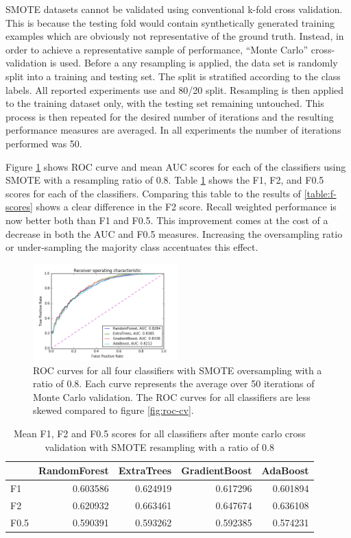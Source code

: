 \documentclass[journal]{IEEEtran}
\begin{document}
SMOTE datasets cannot be validated using conventional k-fold cross validation. This is because the testing fold would contain synthetically generated training examples which are obviously not representative of the ground truth. Instead, in order to achieve a representative sample of performance, ``Monte Carlo'' cross-validation \cite{dubitzky2007fundamentals} is used. Before a any resampling is applied, the data set is randomly split into a training and testing set. The split is stratified according to the class labels. All reported experiments use and 80/20 split. Resampling is then applied to the training dataset only, with the testing set remaining untouched. This process is then repeated for the desired number of iterations and the resulting performance measures are averaged. In all experiments the number of iterations performed was 50.  

Figure \ref{fig:roc-smote} shows ROC curve and mean AUC scores for each of the classifiers using SMOTE with a resampling ratio of 0.8. Table \ref{table:f-score-smote} shows the F1, F2, and F0.5 scores for each of the classifiers. Comparing this table to the results of \ref{table:f-scores} shows a clear difference in the F2 score. Recall weighted performance is now better both than F1 and F0.5. This improvement comes at the cost of a decrease in both the AUC and F0.5 measures. Increasing the oversampling ratio or under-sampling the majority class accentuates this effect.

\begin{figure}[!t]
\centering
\includegraphics[width=0.5\textwidth]{../src/img/roc_smote.png}
\caption{ROC curves for all four classifiers with SMOTE oversampling with a ratio of 0.8. Each curve represents the average over 50 iterations of Monte Carlo validation. The ROC curves for all classifiers are less skewed compared to figure \ref{fig:roc-cv}.}
\label{fig:roc-smote}
\end{figure}

\begin{table}
\caption{Mean F1, F2 and F0.5 scores for all classifiers after monte carlo cross validation with SMOTE resampling with a ratio of 0.8}
\begin{tabular}{lrrrr}
{} &  RandomForest &  ExtraTrees &  GradientBoost &  AdaBoost \\
\hline
F1   &      0.603586 &    0.624919 &       0.617296 &  0.601894 \\
F2   &      0.620932 &    0.663461 &       0.647674 &  0.636108 \\
F0.5 &      0.590391 &    0.593262 &       0.592385 &  0.574231 \\
\end{tabular}
\label{table:f-score-smote}
\end{table}
\end{document}
